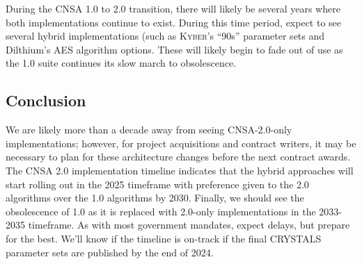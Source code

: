 During the CNSA 1.0 to 2.0 transition, there will likely be several years where both implementations continue to exist. During this time period, expect to see several hybrid implementations (such as K\textsc{yber}'s ``90s'' parameter sets and Dilthium's AES algorithm options. These will likely begin to fade out of use as the 1.0 suite continues its slow march to obsolescence.

\subsection{Conclusion}
We are likely more than a decade away from seeing CNSA-2.0-only implementations; however, for project acquisitions and contract writers, it may be necessary to plan for these architecture changes before the next contract awards. The CNSA 2.0 implementation timeline indicates that the hybrid approaches will start rolling out in the 2025 timeframe with preference given to the 2.0 algorithms over the 1.0 algorithms by 2030. Finally, we should see the obsolescence of 1.0 as it is replaced with 2.0-only implementations in the 2033-2035 timeframe. As with most government mandates, expect delays, but prepare for the best. We'll know if the timeline is on-track if the final CRYSTALS parameter sets are published by the end of 2024.
